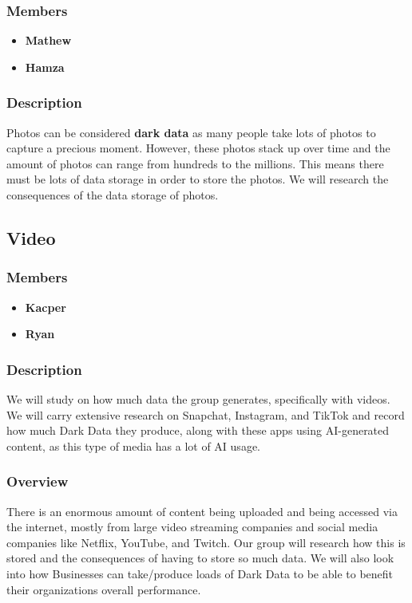 \documentclass{article}
\begin{document}
        \subsubsection{Members}
        \begin{itemize}
            \item \textbf{Mathew}
            \item \textbf{Hamza}
        \end{itemize}
        \subsubsection{Description}
        Photos can be considered \textbf{dark data} as many people take lots of photos to capture a precious moment. However, these photos stack up over time and the amount of photos can range from hundreds to the millions. This means there must be lots of data storage in order to store the photos.
        We will research the consequences of the data storage of photos.

    \subsection{Video}
        \subsubsection{Members}
        \begin{itemize}
            \item \textbf{Kacper}
            \item \textbf{Ryan}
        \end{itemize}
        \subsubsection{Description}
        We will study on how much data the group generates, specifically with videos. We will carry extensive research on Snapchat, Instagram, and TikTok and record how much Dark Data they produce, along with these apps using AI-generated content, as this type of media has a lot of AI usage.

        \subsubsection{Overview}
        There is an enormous amount of content being uploaded and being accessed via the internet, mostly from large video 
        streaming companies and social media companies like Netflix, YouTube, and Twitch. Our group will research
        how this is stored and the consequences of having to store so much data. We will also look into how Businesses can
        take/produce loads of Dark Data to be able to benefit their organizations overall performance.
\end{document}
